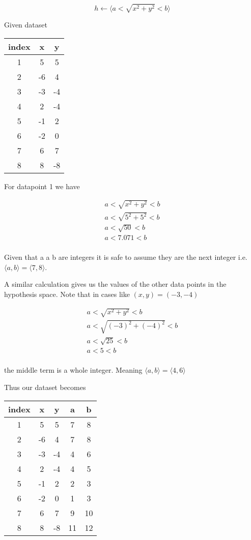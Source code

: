 \documentclass[10pt,a4paper]{article}
\begin{document}
\begin{equation}
h \leftarrow \langle a < \sqrt{x^2 + y^2} < b \rangle
\end{equation}
 
Given dataset

\begin{tabular}{|c|c|c|}
\hline
index & x & y \\
\hline
1 & 5 & 5 \\
2 & -6 & 4 \\
3 & -3 & -4 \\
4 & 2  & -4 \\
5 & -1 & 2 \\
6 & -2 & 0 \\
7 & 6  & 7 \\
8 & 8  & -8 \\
\hline
\end{tabular} 
 
For datapoint 1 we have 

\begin{equation}
\begin{split}
a < \sqrt{x^2 + y^2} < b \\
a < \sqrt{5^2 + 5^2} < b\\
a < \sqrt{50} < b\\ 
a < 7.071 < b \\
\end{split}
\end{equation}

Given that a a b are integers it is safe to assume they are the next integer i.e. $\langle a, b \rangle = \langle 7,8 \rangle$.

A similar calculation gives us the values of the other data points in the hypothesis space. Note that in cases like $(x,y) = (-3,-4)$

\begin{equation}
\begin{split}
a < \sqrt{x^2 + y^2} < b \\
a < \sqrt{(-3)^2 + (-4)^2} < b\\
a < \sqrt{25} < b\\ 
a < 5 < b \\
\end{split}
\end{equation}

the middle term is a whole integer. Meaning  $\langle a, b \rangle = \langle 4,6 \rangle$

Thus our dataset becomes
 
\begin{tabular}{|c|c|c|c|c|}
\hline
index & x & y & a & b\\
\hline
1 & 5 & 5 & 7 & 8\\
2 & -6 & 4 & 7 & 8\\
3 & -3 & -4 & 4&6\\
4 & 2  & -4 & 4&5\\
5 & -1 & 2 & 2&3\\
6 & -2 & 0 & 1&3\\
7 & 6  & 7 & 9&10\\
8 & 8  & -8 & 11&12\\
\hline
\end{tabular} 
 
\end{document}
